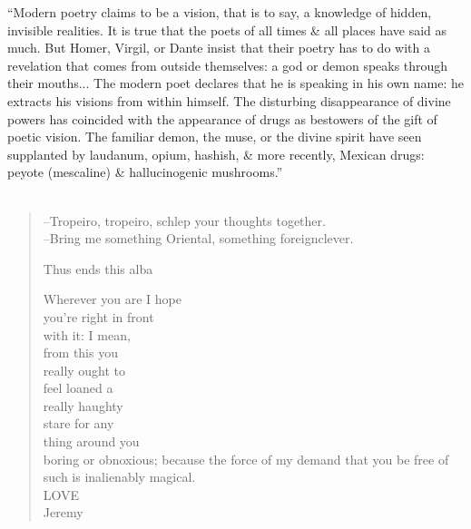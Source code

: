 \documentclass[oneside, 11pt, twocolumn]{book}
\newcounter{secnum}
\newcommand{\secdiv}{
	\vspace{1em}
	\stepcounter{secnum}
	\thesecnum
	\vspace{1em}
}
\begin{document}
\Fontlukas

``Modern poetry claims to be a vision, that is to say, a knowledge of hidden, invisible realities. It is true that the poets of all times \& all places have said as much. But Homer, Virgil, or Dante insist that their poetry has to do with a revelation that comes from outside themselves: a god or demon speaks through their mouths... The modern poet declares that he is speaking in his own name: he extracts his visions from within himself. The disturbing disappearance of divine powers has coincided with the appearance of drugs as bestowers of the gift of poetic vision. The familiar demon, the muse, or the divine spirit have seen supplanted by laudanum, opium, hashish, \& more recently, Mexican drugs: peyote (mescaline) \& hallucinogenic mushrooms.'' \\
\\

\vfill

\begin{verse}

\hfill--Tropeiro, tropeiro, schlep your thoughts together. \\
\hfill--Bring me something Oriental, something foreignclever.


\secdiv

 

\newpage



\newpage



\newpage



\newpage



Thus ends this alba

Wherever you are I hope \\
you're right in front \\ 
with it: I mean, \\
from this you \\
really ought to \\
feel loaned a \\
really haughty \\
stare for any \\
thing around you \\
boring or obnoxious; because the force of my demand that you be free of such is inalienably magical. \\
LOVE \\
Jeremy

\end{verse}
\end{document}
